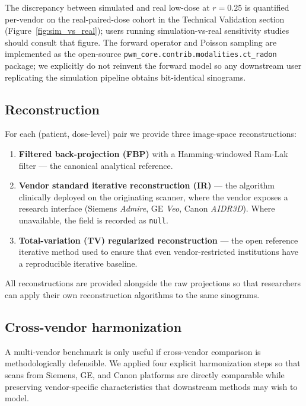 \documentclass[twoside,11pt]{article}
\begin{document}
The discrepancy between simulated and real low-dose at $r = 0.25$ is quantified per-vendor on the real-paired-dose cohort in the Technical Validation section (Figure~\ref{fig:sim_vs_real}); users running simulation-vs-real sensitivity studies should consult that figure. The forward operator and Poisson sampling are implemented as the open-source \texttt{pwm\_core.contrib.modalities.ct\_radon} package; we explicitly do not reinvent the forward model so any downstream user replicating the simulation pipeline obtains bit-identical sinograms.

\subsection*{Reconstruction}

For each (patient, dose-level) pair we provide three image-space reconstructions:

\begin{enumerate}
    \item \textbf{Filtered back-projection (FBP)} with a Hamming-windowed Ram-Lak filter --- the canonical analytical reference.
    \item \textbf{Vendor standard iterative reconstruction (IR)} --- the algorithm clinically deployed on the originating scanner, where the vendor exposes a research interface (Siemens \textit{Admire}, GE \textit{Veo}, Canon \textit{AIDR3D}). Where unavailable, the field is recorded as \texttt{null}.
    \item \textbf{Total-variation (TV) regularized reconstruction} --- the open reference iterative method used to ensure that even vendor-restricted institutions have a reproducible iterative baseline.
\end{enumerate}

All reconstructions are provided alongside the raw projections so that researchers can apply their own reconstruction algorithms to the same sinograms.

\subsection*{Cross-vendor harmonization}

A multi-vendor benchmark is only useful if cross-vendor comparison is methodologically defensible. We applied four explicit harmonization steps so that scans from Siemens, GE, and Canon platforms are directly comparable while preserving vendor-specific characteristics that downstream methods may wish to model.
\end{document}
